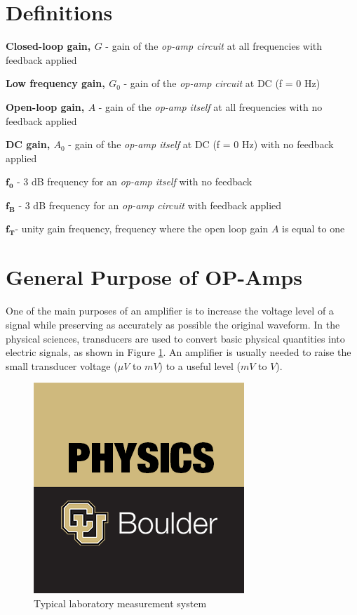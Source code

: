 \documentclass[10pt]{PhysLab1C} %
\begin{document}

\section{Definitions}

\textbf{Closed-loop gain, $G$} - gain of the \emph{op-amp circuit} at all
frequencies with feedback applied

\textbf{Low frequency gain, $G_{0}$} - gain of the
\emph{op-amp circuit} at DC (f = 0 Hz)

\textbf{Open-loop gain, $A$} - gain of the \emph{op-amp itself} at all
frequencies with no feedback applied

\textbf{DC gain, $A_{0}$} - gain of the \emph{op-amp itself}
at DC (f = 0 Hz) with no feedback applied

$\mathbf{f_0}$ - 3 dB frequency for an \emph{op-amp
itself} with no feedback

$\mathbf{f_B}$ - 3 dB frequency for an \emph{op-amp
circuit} with feedback applied

$\mathbf{f_T}$- unity gain frequency, frequency
where the open loop gain $A$ is equal to one


\section{General Purpose of OP-Amps}


One of the main purposes of an amplifier is to increase the voltage
level of a signal while preserving as accurately as possible the
original waveform. In the physical sciences, transducers are used to
convert basic physical quantities into electric signals, as shown in
Figure \ref{lab-measurement}. An amplifier is usually needed to raise the small transducer
voltage ($\mu V$ to $mV$) to a useful level ($mV$ to $V$).

\begin{figure}[h]\centering
    \includegraphics{tmp.png}
    \caption{Typical laboratory measurement system}
    \label{lab-measurement}
\end{figure}
\end{document}
